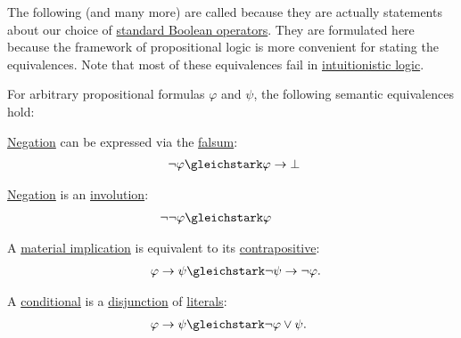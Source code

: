 \begin{proposition}\label{thm:boolean_equivalences}
  The following (and many more) are called  because they are actually statements about our choice of \hyperref[def:standard_boolean_operators]{standard Boolean operators}. They are formulated here because the framework of propositional logic is more convenient for stating the equivalences. Note that most of these equivalences fail in \hyperref[def:intuitionistic_propositional_derivation_system]{intuitionistic logic}.

  For arbitrary propositional formulas \( \varphi \) and \( \psi \), the following semantic equivalences hold:
  \begin{thmenum}
     \hyperref[def:propositional_language/negation]{Negation} can be expressed via the \hyperref[def:propositional_language/constants/falsum]{falsum}:
    \begin{equation}\label{eq:thm:boolean_equivalences/negation_bottom}
      \begin{split}
        \mathllap{\neg \varphi} &\gleichstark \mathrlap{\varphi \rightarrow \bot}.
      \end{split}
    \end{equation}

     \hyperref[def:propositional_language/negation]{Negation} is an \hyperref[def:multi_valued_function/involution]{involution}:
    \begin{equation}\label{eq:thm:boolean_equivalences/double_negation}
      \begin{split}
        \mathllap{\neg \neg \varphi} &\gleichstark \mathrlap{\varphi}.
      \end{split}
    \end{equation}

     A \hyperref[def:material_implication]{material implication} is equivalent to its \hyperref[def:material_implication/contrapositive]{contrapositive}:
    \begin{equation}\label{eq:thm:boolean_equivalences/contrapositive}
      \begin{split}
        \mathllap{\varphi \rightarrow \psi} &\gleichstark \mathrlap{\neg \psi \rightarrow \neg \varphi.}
      \end{split}
    \end{equation}

     A \hyperref[def:propositional_language/connectives/conditional]{conditional} is a \hyperref[def:propositional_language/connectives/disjunction]{disjunction} of \hyperref[def:conjunctive_disjunctive_normal_form/literal]{literals}:
    \begin{equation}\label{eq:thm:boolean_equivalences/conditional_cnf}
      \begin{split}
        \mathllap{\varphi \rightarrow \psi} &\gleichstark \mathrlap{ \neg \varphi \vee \psi. }
      \end{split}
    \end{equation}


\end{thmenum}
\end{proposition}
